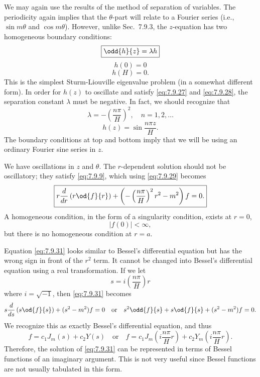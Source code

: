 We may again use the results of the method of separation of variables.  The periodicity again implies that the $\theta$-part will relate to a Fourier series (i.e., $\sin m\theta$ and $\cos m\theta$).  However, unlike Sec.~7.9.3, the $z$-equation has two homogeneous boundary conditions:
\begin{equation}
\boxed{\odd{h}{z} = \lambda h}
\label{eq:7.9.26}
\end{equation}
\begin{equation}
\boxed{h(0) = 0}
\label{eq:7.9.27}
\end{equation}
\begin{equation}
\boxed{h(H) = 0.}
\label{eq:7.9.28}
\end{equation}
This is the simplest Sturm-Liouville eigenvalue problem (in a somewhat different form).  In order for $h(z)$ to oscillate and satisfy \eqref{eq:7.9.27} and \eqref{eq:7.9.28}, the separation constant $\lambda$ must be negative.  In fact, we should recognize that
\begin{equation}
\lambda = -\left(\frac{n\pi}{H}\right)^2, \quad n = 1, 2, \ldots
\label{eq:7.9.29}
\end{equation}
\begin{equation}
h(z) = \sin\frac{n\pi z}{H}.
\label{eq:7.9.30}
\end{equation}
The boundary conditions at top and bottom imply that we will be using an ordinary Fourier sine series in $z$.

We have oscillations in $z$ and $\theta$.  The $r$-dependent solution should not be oscillatory; they satisfy \eqref{eq:7.9.9}, which using \eqref{eq:7.9.29} becomes
\begin{equation}
\boxed{r\frac{d}{d r}\left(r\od{f}{r}\right) + \left(-\left(\frac{n\pi}{H}\right)^2 r^2 - m^2\right)f = 0.}
\label{eq:7.9.31}
\end{equation}
A homogeneous condition, in the form of a singularity condition, exists at $r = 0$,
\begin{equation}
|f(0)| < \infty,
\label{eq:7.9.32}
\end{equation}
but there is no homogeneous condition at $r = a$.

Equation \eqref{eq:7.9.31} looks similar to Bessel's differential equation but has the wrong sign in front of the $r^2$ term.  It cannot be changed into Bessel's differential equation using a real transformation.  If we let
\begin{equation}
s = i\left(\frac{n\pi}{H}\right)r
\label{eq:7.9.33}
\end{equation}
where $i = \sqrt{-1}$, then \eqref{eq:7.9.31} becomes
\[
s\frac{d}{d s}\left(s\od{f}{s}\right) + (s^2 - m^2)f = 0 \quad\text{or}\quad s^2\odd{f}{s} + s\od{f}{s} + (s^2 - m^2)f = 0.
\]
We recognize this as exactly Bessel's differential equation, and thus
\begin{equation}
f = c_1 J_m(s) + c_2 Y(s) \quad\text{or}\quad f = c_1 J_m\left(i\frac{n\pi}{H}r\right) + c_2 Y_m\left(i\frac{n\pi}{H}r\right).
\label{eq:7.9.34}
\end{equation}
Therefore, the solution of \eqref{eq:7.9.31} can be represented in terms of Bessel functions of an imaginary argument.  This is not very useful since Bessel functions are not usually tabulated in this form.

